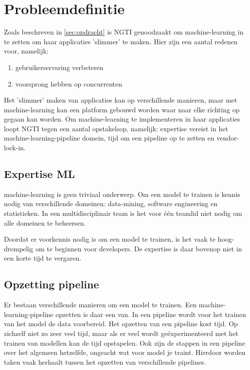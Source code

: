 
\section{Probleemdefinitie}\label{sec:probleemdefinitie}
Zoals beschreven in \autoref{sec:opdracht} is NGTI genoodzaakt om \gls{machine-learning} in te zetten om haar applicaties 'slimmer' te maken. Hier zijn een aantal redenen voor, namelijk:
\begin{enumerate}
  \item gebruikerservaring verbeteren
  \item voorsprong hebben op concurrenten
\end{enumerate}

Het 'slimmer' maken van applicaties kan op verschillende manieren, maar met \gls{machine-learning} kan een platform gebouwd worden waar naar elke richting op gegaan kan worden. Om \gls{machine-learning} te implementeren in haar applicaties loopt NGTI tegen een aantal opstakelsop, namelijk: expertise vereist in het \gls{machine-learning-pipeline} domein, tijd om een pipeline op te zetten en \gls{vendor-lock-in}.

\subsection{Expertise ML}\label{sec:expertise-vereist}
\Gls{machine-learning} is geen triviaal onderwerp. Om een model te trainen is kennis nodig van verschillende domeinen: \gls{data-mining}, software engineering en statistieken. In een multidisciplinair team is het voor één teamlid niet nodig om alle domeinen te beheersen.

Doordat er voorkennis nodig is om een model te trainen, is het vaak te hoog-drempelig om te beginnen voor developers. De expertise is daar bovenop niet in een korte tijd te vergaren.

\subsection{Opzetting pipeline}\label{sec:opzetten-pipeline}
Er bestaan verschillende manieren om een model te trainen. Een \gls{machine-learning-pipeline} opzetten is daar een van. In een pipeline wordt voor het trainen van het model de data voorbereid. Het opzetten van een pipeline kost tijd. Op zichzelf niet zo zeer veel tijd, maar als er veel wordt geëxperimenteerd met het trainen van modellen kan de tijd opstapelen. Ook zijn de stappen in een pipeline over het algemeen hetzelfde, ongeacht wat voor model je traint. Hierdoor worden taken vaak herhaalt tussen het opzetten van verschillende pipelines.

